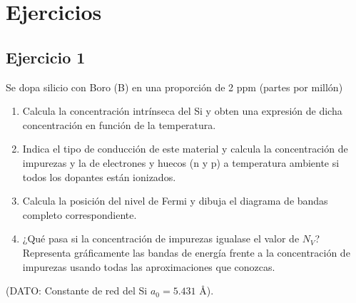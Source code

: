
\section*{Ejercicios}

\begin{Enunciado}
\subsection*{Ejercicio 1}


	Se dopa silicio con Boro (B) en una proporción de 2 ppm (partes por millón)
	\begin{enumerate}[label=\alph*)]
		\item Calcula la concentración intrínseca del Si y obten una expresión de dicha concentración en función de la temperatura.
		\item Indica el tipo de conducción de este material y calcula la concentración de impurezas y la de electrones y huecos (n y p) a temperatura ambiente si todos los dopantes están ionizados.
		\item Calcula la posición del nivel de Fermi y dibuja el diagrama de bandas completo correspondiente.
		\item ¿Qué pasa si la concentración de impurezas igualase el valor de \( N_V \)? Representa gráficamente las bandas de energía frente a la concentración de impurezas usando todas las aproximaciones que conozcas.
	\end{enumerate}
	(DATO: Constante de red del Si \( a_0 = 5.431 \) Å).

\end{Enunciado}


